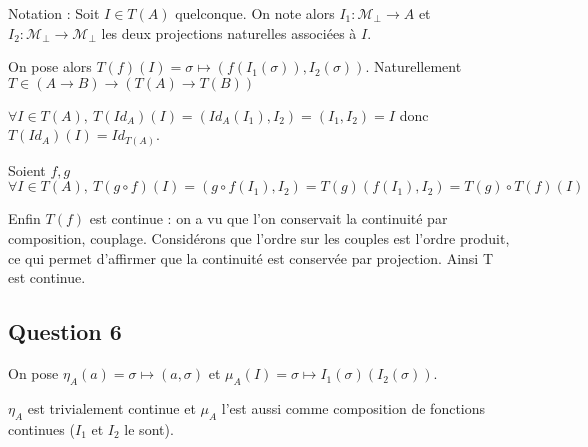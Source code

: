 \documentclass{article}
\newcommand{\M}{\mathcal{M}}
\begin{document}
Notation : Soit $I \in T\left (A\right )$ quelconque. On note alors $I_1 : \M_\bot \rightarrow A$ et $I_2 : \M_\bot \rightarrow \M_\bot$ les deux projections naturelles associées à $I$.

On pose alors $T\left (f\right )\left (I\right ) = \sigma \mapsto \left (f\left (I_1\left (\sigma\right )\right ), I_2\left (\sigma\right )\right )$. Naturellement $T\in \left (A \rightarrow B\right ) \rightarrow \left (T\left (A\right )\rightarrow T\left (B\right )\right )$

$\forall I\in T\left (A\right ), \ T\left (Id_A\right )\left (I\right )=\left (Id_A\left (I_1\right ),I_2\right )=\left (I_1,I_2\right )=I$ donc $T\left (Id_A\right )\left (I\right )=Id_{T\left (A\right )}$.

Soient $f,g$ $\forall I\in T\left (A\right ),\ T\left (g\circ f\right )\left (I\right )=\left (g\circ f\left (I_1\right ),I_2\right )=T\left (g\right )\left (f\left (I_1\right ),I_2\right )=T\left (g\right )\circ T\left (f\right )\left (I\right )$

Enfin $T\left (f\right )$ est continue : on a vu que l'on conservait la continuité par composition, couplage. Considérons que l'ordre sur les couples est l'ordre produit, ce qui permet d'affirmer que la continuité est conservée par projection. Ainsi T est continue.


\subsection*{Question 6}

On pose $\eta_A\left (a\right ) = \sigma \mapsto \left (a, \sigma\right )$ et $\mu_A\left (I\right ) = \sigma \mapsto I_1\left (\sigma\right )\left (I_2\left (\sigma\right )\right )$. 

$\eta_A$ est trivialement continue et $\mu_A$ l'est aussi comme composition de fonctions continues  ($I_1$ et $I_2$ le sont).
\end{document}
